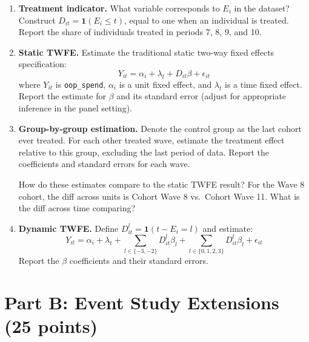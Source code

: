 \documentclass[11pt]{article}
\begin{document}
\begin{enumerate}

    \item \textbf{Treatment indicator.} What variable corresponds to $E_i$ in the dataset? Construct $D_{it} = \mathbf{1}(E_i \leq t)$, equal to one when an individual is treated. Report the share of individuals treated in periods 7, 8, 9, and 10.


    \item \textbf{Static TWFE.} Estimate the traditional static two-way fixed effects specification:
    \begin{equation}\label{eq:twfe}
        Y_{it} = \alpha_i + \lambda_t + D_{it}\beta + \epsilon_{it}
    \end{equation}
    where $Y_{it}$ is \texttt{oop\_spend}, $\alpha_i$ is a unit fixed effect, and $\lambda_t$ is a time fixed effect. Report the estimate for $\beta$ and its standard error (adjust for appropriate inference in the panel setting).


    \item \textbf{Group-by-group estimation.} Denote the control group as the last cohort ever treated. For each other treated wave, estimate the treatment effect relative to this group, excluding the last period of data. Report the coefficients and standard errors for each wave.

    How do these estimates compare to the static TWFE result? For the Wave 8 cohort, the diff across units is Cohort Wave 8 vs.\ Cohort Wave 11. What is the diff across time comparing?


    \item \textbf{Dynamic TWFE.} Define $D_{it}^l = \mathbf{1}(t - E_i = l)$ and estimate:
    \begin{equation}\label{eq:twfe_dyn}
        Y_{it} = \alpha_i + \lambda_t + \sum_{l \in \{-3,-2\}} D_{it}^l \beta_l + \sum_{l \in \{0,1,2,3\}} D_{it}^l \beta_l + \epsilon_{it}
    \end{equation}
    Report the $\beta$ coefficients and their standard errors.


\end{enumerate}

\section*{Part B: Event Study Extensions (25 points)}
\end{document}
